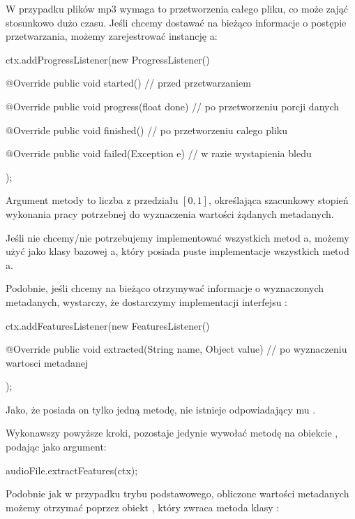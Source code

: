 W przypadku plików mp3 wymaga to przetworzenia całego pliku, co może zająć stosunkowo dużo czasu.
Jeśli chcemy dostawać na bieżąco informacje o postępie przetwarzania, możemy zarejestrować instancję
a:

\begin{java}
ctx.addProgressListener(new ProgressListener() {

    @Override
    public void started() {
        // przed przetwarzaniem
    }

    @Override
    public void progress(float done) {
        // po przetworzeniu porcji danych
    }

    @Override
    public void finished() {
        // po przetworzeniu calego pliku
    }

    @Override
    public void failed(Exception e) {
        // w razie wystapienia bledu
    }
});
\end{java}

Argument  metody  to liczba z przedziału $[0, 1]$, określająca szacunkowy
stopień wykonania pracy potrzebnej do wyznaczenia wartości żądanych metadanych.

Jeśli nie chcemy/nie potrzebujemy implementować wszystkich metod a, możemy
użyć jako klasy bazowej a, który posiada puste implementacje wszystkich metod
a.

Podobnie, jeśli chcemy na bieżąco otrzymywać informacje o wyznaczonych metadanych, wystarczy, że
dostarczymy implementacji interfejsu :

\begin{java}
ctx.addFeaturesListener(new FeaturesListener() {

    @Override
    public void extracted(String name, Object value) {
        // po wyznaczeniu wartosci metadanej
    }
});
\end{java}

Jako, że posiada on tylko jedną metodę, nie istnieje odpowiadający mu .

Wykonawszy powyższe kroki, pozostaje jedynie wywołać metodę  na obiekcie
, podając  jako argument:

\begin{java}
audioFile.extractFeatures(ctx);
\end{java}

Podobnie jak w przypadku trybu podstawowego, obliczone wartości metadanych możemy otrzymać poprzez
obiekt , który zwraca metoda  klasy :

